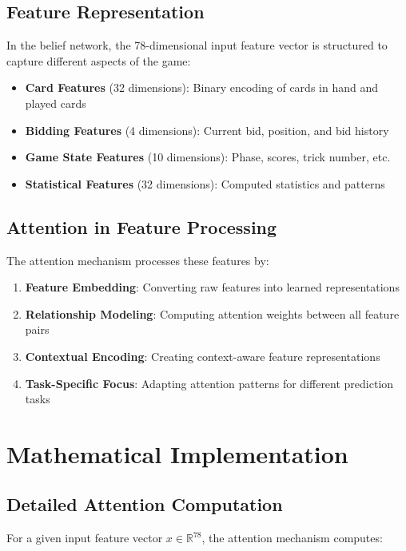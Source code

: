 \documentclass[conference]{IEEEtran}
\begin{document}
\subsection{Feature Representation}

In the belief network, the 78-dimensional input feature vector is structured to capture different aspects of the game:

\begin{itemize}
    \item \textbf{Card Features} (32 dimensions): Binary encoding of cards in hand and played cards
    \item \textbf{Bidding Features} (4 dimensions): Current bid, position, and bid history
    \item \textbf{Game State Features} (10 dimensions): Phase, scores, trick number, etc.
    \item \textbf{Statistical Features} (32 dimensions): Computed statistics and patterns
\end{itemize}

\subsection{Attention in Feature Processing}

The attention mechanism processes these features by:

\begin{enumerate}
    \item \textbf{Feature Embedding}: Converting raw features into learned representations
    \item \textbf{Relationship Modeling}: Computing attention weights between all feature pairs
    \item \textbf{Contextual Encoding}: Creating context-aware feature representations
    \item \textbf{Task-Specific Focus}: Adapting attention patterns for different prediction tasks
\end{enumerate}

\section{Mathematical Implementation}

\subsection{Detailed Attention Computation}

For a given input feature vector $x \in \mathbb{R}^{78}$, the attention mechanism computes:
\end{document}
